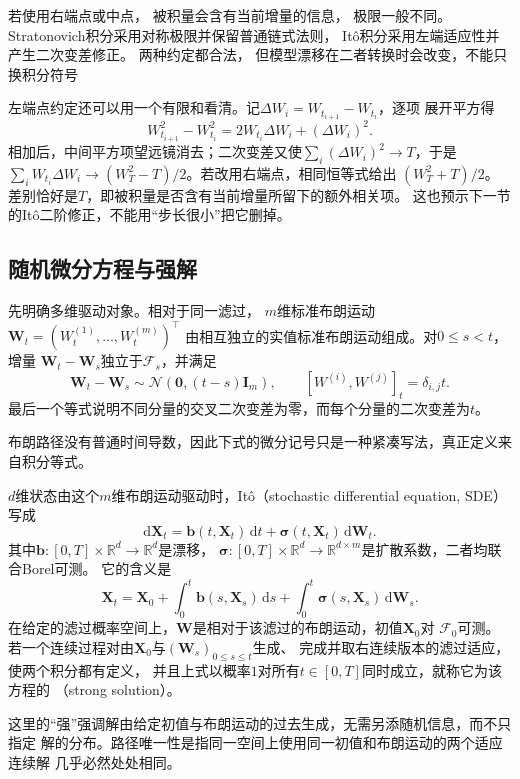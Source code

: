若使用右端点或中点， 被积量会含有当前增量的信息， 极限一般不同。
Stratonovich积分采用对称极限并保留普通链式法则，
Itô积分采用左端适应性并产生二次变差修正。 两种约定都合法，
但模型漂移在二者转换时会改变，不能只换积分符号

左端点约定还可以用一个有限和看清。记$\Delta W_i=W_{t_{i+1}}-W_{t_i}$，逐项
展开平方得
\[
  W_{t_{i+1}}^2-W_{t_i}^2
  =2W_{t_i}\Delta W_i+(\Delta W_i)^2.
\]
相加后，中间平方项望远镜消去；二次变差又使$\sum_i(\Delta W_i)^2\to T$，于是
$\sum_iW_{t_i}\Delta W_i\to(W_T^2-T)/2$。若改用右端点，相同恒等式给出
$(W_T^2+T)/2$。差别恰好是$T$，即被积量是否含有当前增量所留下的额外相关项。
这也预示下一节的Itô二阶修正，不能用“步长很小”把它删掉。

\subsection{随机微分方程与强解}

先明确多维驱动对象。相对于同一滤过，
$m$维标准布朗运动
$\bm W_t=(W_t^{(1)},\ldots,W_t^{(m)})^\top$
由相互独立的实值标准布朗运动组成。对$0\leq s<t$，增量
$\bm W_t-\bm W_s$独立于$\mathcal F_s$，并满足
\[
	\bm W_t-\bm W_s\sim\mathcal N(\bm0,(t-s)\bm I_m),
	\qquad
	[W^{(i)},W^{(j)}]_t=\delta_{i,j}t.
\]
最后一个等式说明不同分量的交叉二次变差为零，而每个分量的二次变差为$t$。

布朗路径没有普通时间导数，因此下式的微分记号只是一种紧凑写法，真正定义来自积分等式。
\begin{definition}[Itô随机微分方程与强解]
\label{def:dynamical-ito-sde-strong-solution}
$d$维状态由这个$m$维布朗运动驱动时，Itô（stochastic differential equation, SDE）写成
\begin{equation}
	\mathrm{d}\bm{X}_{t}= \bm{b}(t,\bm{X}_{t})\,\mathrm{d}t + \bm{\sigma}(t,\bm{X}_{t}
	)\,\mathrm{d}\bm{W}_{t}. \label{eq:dynamical-ito-sde}
\end{equation}
其中$\bm{b}:[0,T]\times\mathbb{R}^d\to\mathbb{R}^d$是漂移，
$\bm{\sigma}:[0,T]\times\mathbb{R}^d\to\mathbb{R}^{d\times m}$是扩散系数，二者均联合Borel可测。
它的含义是
\[
	\bm{X}_{t}= \bm{X}_{0}+ \int_{0}^{t}\bm{b}(s,\bm{X}_{s})\,\mathrm{d}s+ \int_{0}
	^{t}\bm{\sigma}(s,\bm{X}_{s})\,\mathrm{d}\bm{W}_{s}.
\]
在给定的滤过概率空间上，$\bm W$是相对于该滤过的布朗运动，初值$\bm X_0$对
$\mathcal F_0$可测。若一个连续过程对由$\bm X_0$与$(\bm W_s)_{0\leq s\leq t}$生成、
完成并取右连续版本的滤过适应，使两个积分都有定义，
并且上式以概率$1$对所有$t\in[0,T]$同时成立，就称它为该方程的
（strong solution）。
\end{definition}
这里的“强”强调解由给定初值与布朗运动的过去生成，无需另添随机信息，而不只指定
解的分布。路径唯一性是指同一空间上使用同一初值和布朗运动的两个适应连续解
几乎必然处处相同。

